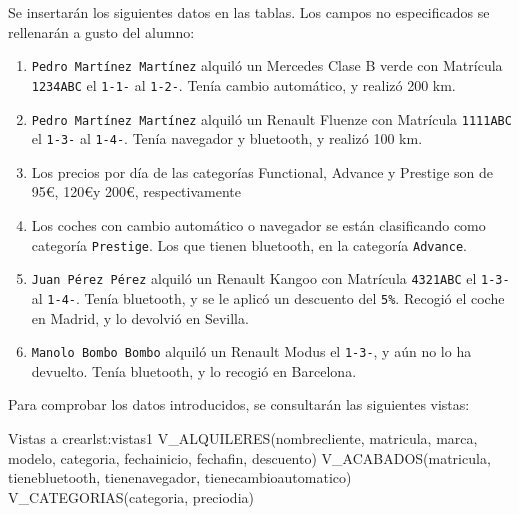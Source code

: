 \begin{homeworkProblem}
  Se insertarán los siguientes datos en las tablas. Los campos no especificados se
  rellenarán a gusto del alumno:

  \begin{enumerate}
  \item  \texttt{Pedro Martínez Martínez} alquiló un Mercedes Clase B verde con
    Matrícula \texttt{1234ABC} el \texttt{1-1-\anio} al \texttt{1-2-\anio}. Tenía cambio automático, y
    realizó 200 km.
  \item  \texttt{Pedro Martínez Martínez} alquiló un Renault Fluenze con Matrícula
    \texttt{1111ABC} el \texttt{1-3-\anio} al \texttt{1-4-\anio}. Tenía navegador y bluetooth, y realizó
    100 km.
  \item  Los precios por día de las categorías Functional, Advance y Prestige
    son de 95\euro, 120\euro y 200\euro, respectivamente

  \item  Los coches con cambio automático o navegador se están clasificando
    como categoría \texttt{Prestige}. Los que tienen bluetooth, en la categoría
    \texttt{Advance}.
  \item  \texttt{Juan Pérez Pérez} alquiló un Renault Kangoo con Matrícula \texttt{4321ABC} el
    \texttt{1-3-\anio} al \texttt{1-4-\anio}. Tenía bluetooth, y se le aplicó un descuento del \texttt{5\%}.
    Recogió el coche en Madrid, y lo devolvió en Sevilla.
  \item  \texttt{Manolo Bombo Bombo} alquiló un Renault Modus el \texttt{1-3-\anio}, y aún no lo
    ha devuelto. Tenía bluetooth, y lo recogió en Barcelona.
  \end{enumerate}

  Para comprobar los datos introducidos, se consultarán las siguientes vistas:
  
  \begin{listadosql}{Vistas a crear}{lst:vistas1}
  V_ALQUILERES(nombrecliente, matricula, marca, modelo, categoria, fechainicio, fechafin, descuento)
  V_ACABADOS(matricula, tienebluetooth, tienenavegador, tienecambioautomatico)
  V_CATEGORIAS(categoria, preciodia)
  \end{listadosql}
\end{homeworkProblem}


